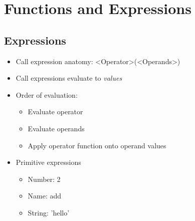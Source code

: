 \chapter{Functions and Expressions}

\section{Expressions}
\begin{itemize}
	\item Call expression anatomy: <Operator>(<Operands>)
	\item Call expressions evaluate to \emph{values}
	\item Order of evaluation:
	\begin{itemize}
		\item Evaluate operator
		\item Evaluate operands
		\item Apply operator function onto operand values
	\end{itemize}
	\item Primitive expressions
	\begin{itemize}
		\item Number: 2
		\item Name: add
		\item String: 'hello'
	\end{itemize}
\end{itemize}

